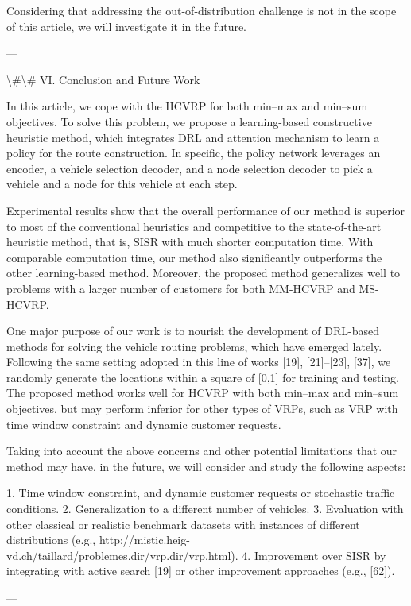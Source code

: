 \documentclass{article}
\begin{document}
	Considering that addressing the out-of-distribution challenge is not in the scope of this article, we will investigate it in the future.
	
	---
	
	\textbackslash{}#\textbackslash{}# VI. Conclusion and Future Work
	
	In this article, we cope with the HCVRP for both min–max and min–sum objectives. To solve this problem, we propose a learning-based constructive heuristic method, which integrates DRL and attention mechanism to learn a policy for the route construction. In specific, the policy network leverages an encoder, a vehicle selection decoder, and a node selection decoder to pick a vehicle and a node for this vehicle at each step.
	
	Experimental results show that the overall performance of our method is superior to most of the conventional heuristics and competitive to the state-of-the-art heuristic method, that is, SISR with much shorter computation time. With comparable computation time, our method also significantly outperforms the other learning-based method. Moreover, the proposed method generalizes well to problems with a larger number of customers for both MM-HCVRP and MS-HCVRP.
	
	One major purpose of our work is to nourish the development of DRL-based methods for solving the vehicle routing problems, which have emerged lately. Following the same setting adopted in this line of works [19], [21]–[23], [37], we randomly generate the locations within a square of [0,1] for training and testing. The proposed method works well for HCVRP with both min–max and min–sum objectives, but may perform inferior for other types of VRPs, such as VRP with time window constraint and dynamic customer requests.
	
	Taking into account the above concerns and other potential limitations that our method may have, in the future, we will consider and study the following aspects:
	
	1. Time window constraint, and dynamic customer requests or stochastic traffic conditions.
	2. Generalization to a different number of vehicles.
	3. Evaluation with other classical or realistic benchmark datasets with instances of different distributions (e.g., http://mistic.heig-vd.ch/taillard/problemes.dir/vrp.dir/vrp.html).
	4. Improvement over SISR by integrating with active search [19] or other improvement approaches (e.g., [62]).
	
	---
	
\end{document}
